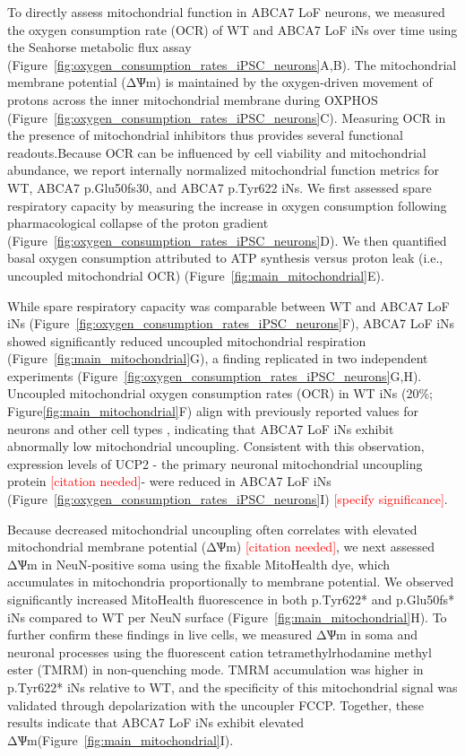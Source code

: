 To directly assess mitochondrial function in ABCA7 LoF neurons, we measured the oxygen consumption rate (OCR) of WT and ABCA7 LoF iNs over time using the Seahorse metabolic flux assay (Figure~\ref{fig:oxygen_consumption_rates_iPSC_neurons}A,B). The mitochondrial membrane potential (ΔѰm) is maintained by the oxygen-driven movement of protons across the inner mitochondrial membrane during OXPHOS (Figure~\ref{fig:oxygen_consumption_rates_iPSC_neurons}C). Measuring OCR in the presence of mitochondrial inhibitors thus provides several functional readouts.Because OCR can be influenced by cell viability and mitochondrial abundance\cite{Divakaruni2014-eq,Gu2021-ms}, we report internally normalized mitochondrial function metrics\cite{Divakaruni2022-rj} for WT, ABCA7 p.Glu50fs30, and ABCA7 p.Tyr622 iNs. We first assessed spare respiratory capacity by measuring the increase in oxygen consumption following pharmacological collapse of the proton gradient\cite{Divakaruni2022-rj} (Figure~\ref{fig:oxygen_consumption_rates_iPSC_neurons}D). We then quantified basal oxygen consumption attributed to ATP synthesis versus proton leak (i.e., uncoupled mitochondrial OCR)\cite{Divakaruni2014-eq} (Figure~\ref{fig:main_mitochondrial}E).

While spare respiratory capacity was comparable between WT and ABCA7 LoF iNs (Figure~\ref{fig:oxygen_consumption_rates_iPSC_neurons}F), ABCA7 LoF iNs showed significantly reduced uncoupled mitochondrial respiration (Figure~\ref{fig:main_mitochondrial}G), a finding replicated in two independent experiments (Figure~\ref{fig:oxygen_consumption_rates_iPSC_neurons}G,H). Uncoupled mitochondrial oxygen consumption rates (OCR) in WT iNs (20\%; Figure\ref{fig:main_mitochondrial}F) align with previously reported values for neurons and other cell types \cite{Divakaruni2011-uj,Jekabsons2004-fn}, indicating that ABCA7 LoF iNs exhibit abnormally low mitochondrial uncoupling. Consistent with this observation, expression levels of UCP2 - the primary neuronal mitochondrial uncoupling protein \textcolor{red}{[citation needed]}- were reduced in ABCA7 LoF iNs (Figure~\ref{fig:oxygen_consumption_rates_iPSC_neurons}I) \textcolor{red}{[specify significance]}. 

Because decreased mitochondrial uncoupling often correlates with elevated mitochondrial membrane potential (ΔѰm) \textcolor{red}{[citation needed]}, we next assessed ΔѰm in NeuN-positive soma using the fixable MitoHealth dye, which accumulates in mitochondria proportionally to membrane potential. We observed significantly increased MitoHealth fluorescence in both p.Tyr622* and p.Glu50fs* iNs compared to WT per NeuN surface (Figure~\ref{fig:main_mitochondrial}H). To further confirm these findings in live cells, we measured ΔѰm in soma and neuronal processes using the fluorescent cation tetramethylrhodamine methyl ester (TMRM) in non-quenching mode. TMRM accumulation was higher in p.Tyr622* iNs relative to WT, and the specificity of this mitochondrial signal was validated through depolarization with the uncoupler FCCP. Together, these results indicate that ABCA7 LoF iNs exhibit elevated ΔѰm(Figure~\ref{fig:main_mitochondrial}I). 

